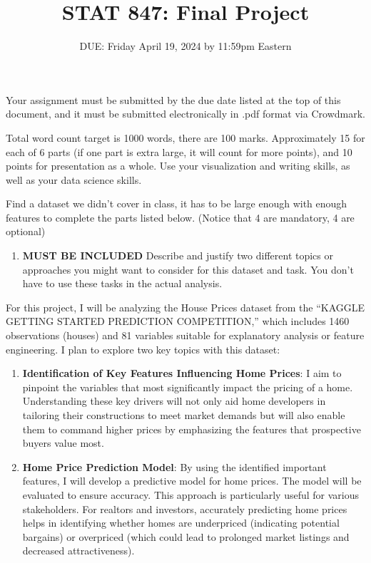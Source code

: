 \documentclass[
]{article}
\title{STAT 847: Final Project}
\subtitle{DUE: Friday April 19, 2024 by 11:59pm Eastern}
\author{}
\date{\vspace{-2.5em}}
\providecommand{\tightlist}{%
  \setlength{\itemsep}{0pt}\setlength{\parskip}{0pt}}
\begin{document}
\maketitle

Your assignment must be submitted by the due date listed at the top of
this document, and it must be submitted electronically in .pdf format
via Crowdmark.

Total word count target is 1000 words, there are 100 marks.
Approximately 15 for each of 6 parts (if one part is extra large, it
will count for more points), and 10 points for presentation as a whole.
Use your visualization and writing skills, as well as your data science
skills.

Find a dataset we didn't cover in class, it has to be large enough with
enough features to complete the parts listed below. (Notice that 4 are
mandatory, 4 are optional)

\vspace{2cm}

\begin{enumerate}
\def\labelenumi{\arabic{enumi})}
\tightlist
\item
  \textbf{MUST BE INCLUDED} Describe and justify two different topics or
  approaches you might want to consider for this dataset and task. You
  don't have to use these tasks in the actual analysis.
\end{enumerate}

For this project, I will be analyzing the House Prices dataset from the
``KAGGLE GETTING STARTED PREDICTION COMPETITION,'' which includes 1460
observations (houses) and 81 variables suitable for explanatory analysis
or feature engineering. I plan to explore two key topics with this
dataset:

\begin{enumerate}
\def\labelenumi{\arabic{enumi}.}
\tightlist
\item
  \textbf{Identification of Key Features Influencing Home Prices}: I aim
  to pinpoint the variables that most significantly impact the pricing
  of a home. Understanding these key drivers will not only aid home
  developers in tailoring their constructions to meet market demands but
  will also enable them to command higher prices by emphasizing the
  features that prospective buyers value most.
\item
  \textbf{Home Price Prediction Model}: By using the identified
  important features, I will develop a predictive model for home prices.
  The model will be evaluated to ensure accuracy. This approach is
  particularly useful for various stakeholders. For realtors and
  investors, accurately predicting home prices helps in identifying
  whether homes are underpriced (indicating potential bargains) or
  overpriced (which could lead to prolonged market listings and
  decreased attractiveness).
\end{enumerate}
\end{document}

